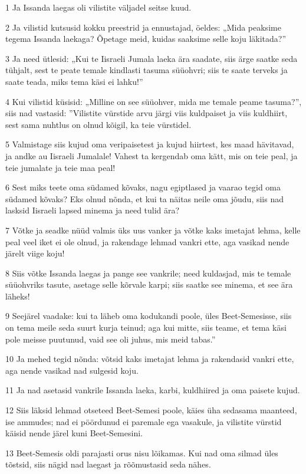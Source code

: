 \par 1 Ja Issanda laegas oli vilistite väljadel seitse kuud.
\par 2 Ja vilistid kutsusid kokku preestrid ja ennustajad, öeldes: „Mida peaksime tegema Issanda laekaga? Õpetage meid, kuidas saaksime selle koju läkitada?”
\par 3 Ja need ütlesid: „Kui te Iisraeli Jumala laeka ära saadate, siis ärge saatke seda tühjalt, sest te peate temale kindlasti tasuma süüohvri; siis te saate terveks ja saate teada, miks tema käsi ei lahku!”
\par 4 Kui vilistid küsisid: „Milline on see süüohver, mida me temale peame tasuma?”, siis nad vastasid: ”Vilistite vürstide arvu järgi viis kuldpaiset ja viis kuldhiirt, sest sama nuhtlus on olnud kõigil, ka teie vürstidel.
\par 5 Valmistage siis kujud oma veripaisetest ja kujud hiirtest, kes maad hävitavad, ja andke au Iisraeli Jumalale! Vahest ta kergendab oma kätt, mis on teie peal, ja teie jumalate ja teie maa peal!
\par 6 Sest miks teete oma südamed kõvaks, nagu egiptlased ja vaarao tegid oma südamed kõvaks? Eks olnud nõnda, et kui ta näitas neile oma jõudu, siis nad lasksid Iisraeli lapsed minema ja need tulid ära?
\par 7 Võtke ja seadke nüüd valmis üks uus vanker ja võtke kaks imetajat lehma, kelle peal veel iket ei ole olnud, ja rakendage lehmad vankri ette, aga vasikad nende järelt viige koju!
\par 8 Siis võtke Issanda laegas ja pange see vankrile; need kuldasjad, mis te temale süüohvriks tasute, asetage selle kõrvale karpi; siis saatke see minema, et see ära läheks!
\par 9 Seejärel vaadake: kui ta läheb oma kodukandi poole, üles Beet-Semesisse, siis on tema meile seda suurt kurja teinud; aga kui mitte, siis teame, et tema käsi pole meisse puutunud, vaid see oli juhus, mis meid tabas.”
\par 10 Ja mehed tegid nõnda: võtsid kaks imetajat lehma ja rakendasid vankri ette, aga nende vasikad nad sulgesid koju.
\par 11 Ja nad asetasid vankrile Issanda laeka, karbi, kuldhiired ja oma paisete kujud.
\par 12 Siis läksid lehmad otseteed Beet-Semesi poole, käies üha sedasama maanteed, ise ammudes; nad ei pöördunud ei paremale ega vasakule, ja vilistite vürstid käisid nende järel kuni Beet-Semesini.
\par 13 Beet-Semesis oldi parajasti orus nisu lõikamas. Kui nad oma silmad üles tõstsid, siis nägid nad laegast ja rõõmustasid seda nähes.
